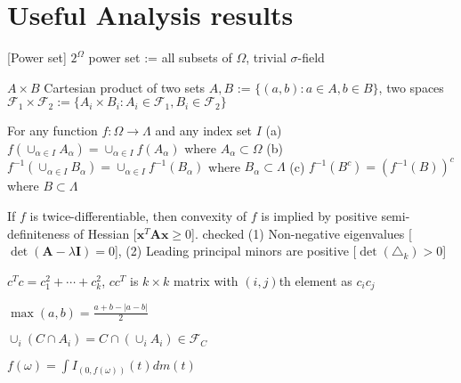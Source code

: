 \section{Useful Analysis results}

[Power set]
$2^\Omega$ power set := {all subsets of $\Omega$}, trivial $\sigma$-field

$A\times B$ Cartesian product of two sets $A, B$ := $\{(a, b): a\in A, b\in B\}$,
two spaces $\mathcal{F}_1 \times \mathcal{F}_2 := \{A_i \times B_i: A_i\in \mathcal{F}_1, B_i \in \mathcal{F}_2\}$

 For any function $f: \Omega \rightarrow \Lambda$ and any index set $I$
\newline(a) $f\left( \cup_{\alpha\in I} A_\alpha \right) = \cup_{\alpha\in I}f(A_\alpha)$ where $A_\alpha \subset \Omega$
\newline(b) $f^{-1}\left(\cup_{\alpha\in I} B_\alpha \right) = \cup_{\alpha\in I}f^{-1}(B_\alpha)$ where $B_\alpha \subset \Lambda$
\newline(c) $f^{-1}(B^c) = (f^{-1}(B))^c$ where $B \subset \Lambda$

 If $f$ is twice-differentiable, then convexity of $f$ is implied by positive semi-definiteness of Hessian [$\mathbf{x}^T\mathbf{Ax}\geq0$]. checked (1) Non-negative eigenvalues [$\det(\mathbf{A}-\lambda\mathbf{I})= 0$], (2) Leading principal minors are positive [$\det(\triangle_k)>0$]

 $c^{T}c=c_1^2 + \cdots + c_k^2$, $cc^{T}$ is $k\times k$ matrix with $(i, j)$th element as $c_ic_j$

 $\max(a, b) = \frac{a+b-|a-b|}{2}$

 $\cup_i (C\cap A_i) = C\cap (\cup_i A_i)\in \mathcal{F}_C$

$f(\omega) = \int I_{(0, f(\omega))}(t) dm(t)$